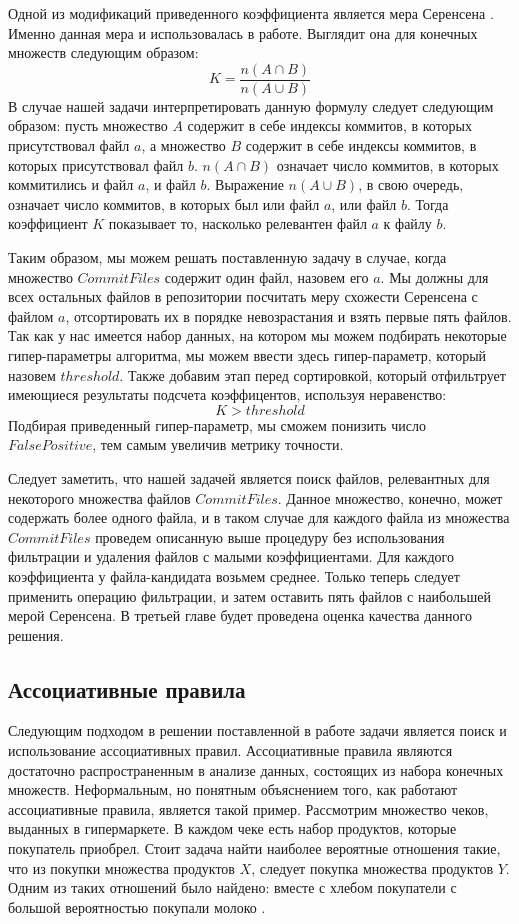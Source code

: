 Одной из модификаций приведенного коэффициента является мера Серенсена \cite{jacard2}. Именно данная мера и использовалась в работе. Выглядит она для конечных множеств следующим образом:
    $$K = \frac{n(A \cap B)}{n(A \cup B)}$$
В случае нашей задачи интерпретировать данную формулу следует следующим образом: пусть множество $A$ содержит в себе индексы коммитов, в которых присутствовал файл $a$, а множество $B$ содержит в себе индексы коммитов, в которых присутствовал файл $b$. $n(A \cap B)$ означает число коммитов, в которых коммитились и файл $a$, и файл $b$. Выражение $n(A \cup B)$, в свою очередь, означает число коммитов, в которых был или файл $a$, или файл $b$. Тогда коэффициент $K$ показывает то, насколько релевантен файл $a$ к файлу $b$. 

Таким образом, мы можем решать поставленную задачу в случае, когда множество $CommitFiles$ содержит один файл, назовем его $a$. Мы должны для всех остальных файлов в репозитории посчитать меру схожести Серенсена с файлом $a$, отсортировать их в порядке невозрастания и взять первые пять файлов. Так как у нас имеется набор данных, на котором мы можем подбирать некоторые гипер-параметры алгоритма, мы можем ввести здесь гипер-параметр, который назовем $threshold$. Также добавим этап перед сортировкой, который отфильтрует имеющиеся результаты подсчета коэффицентов, используя неравенство: 
    $$K > threshold$$
Подбирая приведенный гипер-параметр, мы сможем понизить число $FalsePositive$, тем самым увеличив метрику точности.

Следует заметить, что нашей задачей является поиск файлов, релевантных для некоторого множества файлов $CommitFiles$. Данное множество, конечно, может содержать более одного файла, и в таком случае для каждого файла из множества $CommitFiles$ проведем описанную выше процедуру без использования фильтрации и удаления файлов с малыми коэффициентами. Для каждого коэффициента у файла-кандидата возьмем среднее. Только теперь следует применить операцию фильтрации, и затем оставить пять файлов с наибольшей мерой Серенсена. В третьей главе будет проведена оценка качества данного решения.
    \subsection{Ассоциативные правила}\label{chapter2-rules}
Следующим подходом в решении поставленной в работе задачи является поиск и использование ассоциативных правил. Ассоциативные правила являются достаточно распространенным в анализе данных, состоящих из набора конечных множеств. Неформальным, но понятным объяснением того, как работают ассоциативные правила, является такой пример. Рассмотрим множество чеков, выданных в гипермаркете. В каждом чеке есть набор продуктов, которые покупатель приобрел. Стоит задача найти наиболее вероятные отношения такие, что из покупки множества продуктов $X$, следует покупка множества продуктов $Y$. Одним из таких отношений было найдено: вместе с хлебом покупатели с большой вероятностью покупали молоко \cite{as-rules}.
